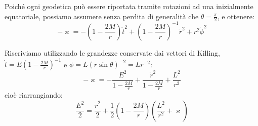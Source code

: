 Poiché ogni geodetica può essere riportata tramite rotazioni ad una inizialmente equatoriale, possiamo assumere senza perdita di generalità che $\theta = \frac{\pi}{2}$, e ottenere:
\begin{equation*}
    - \varkappa = - \left( 1- \frac{2M}{r}\right) \Dot{t}^2 + \left( 1- \frac{2M}{r}\right)^{-1}\Dot{r}^2 + r^2\Dot{\phi}^2
\end{equation*}

Riscriviamo utilizzando le grandezze conservate dai vettori di Killing, $\Dot{t} = E(1-\frac{2M}{r})^{-1}$ e $\Dot{\phi} = L (r\sin\theta)^{-2}= Lr^{-2}$:
\begin{equation*}
    - \varkappa = -\frac{E^2}{1-\frac{2M}{r}} + \frac{\Dot{r}^2}{1-\frac{2M}{r}} + \frac{L^2}{r^2}
\end{equation*}
cioè riarrangiando:
\begin{equation}
    \frac{E^2}{2} = \frac{\Dot{r}^2}{2} + \frac{1}{2}\left(1-\frac{2M}{r}\right) \left(\frac{L^2}{r^2} + \varkappa \right)
    \label{eq.motoradialegeodschwarz}
\end{equation}

